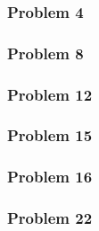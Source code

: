 \documentclass{article}%
\begin{document}
\subsubsection{Problem 4}

\subsubsection{Problem 8}

\subsubsection{Problem 12}

\subsubsection{Problem 15}

\subsubsection{Problem 16}

\subsubsection{Problem 22}
\end{document}
